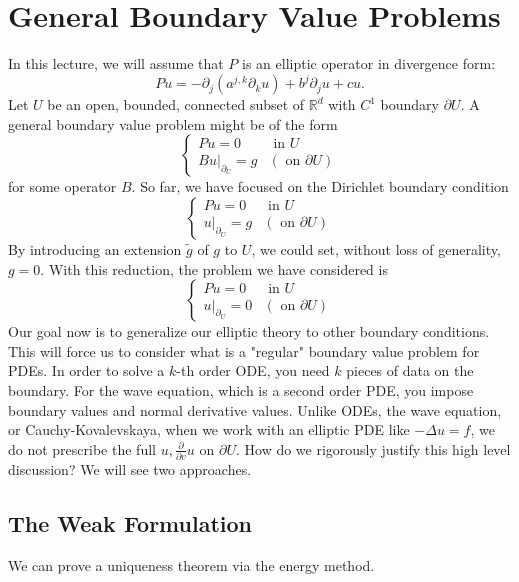 \newpage
\section{General Boundary Value Problems}

In this lecture, we will assume that $P$ is an elliptic operator in divergence form:
$$
P u=-\partial_{j}\left(a^{j, k} \partial_{k} u\right)+b^{j} \partial_{j} u+c u .
$$
Let $U$ be an open, bounded, connected subset of $\mathbb{R}^{d}$ with $C^{1}$ boundary $\partial U$. A general boundary value problem might be of the form
$$
\begin{cases}P u=0 & \text { in } U \\ \left.B u\right|_{\partial_{U}}=g & (\text { on } \partial U)\end{cases}
$$
for some operator $B$.
So far, we have focused on the Dirichlet boundary condition
$$
\begin{cases}P u=0 & \text { in } U \\ \left.u\right|_{\partial_{U}}=g & (\text { on } \partial U)\end{cases}
$$
By introducing an extension $\tilde{g}$ of $g$ to $U$, we could set, without loss of generality, $g=0$. With this reduction, the problem we have considered is
$$
\begin{cases}P u=0 & \text { in } U \\ \left.u\right|_{\partial_{U}}=0 & (\text { on } \partial U)\end{cases}
$$
Our goal now is to generalize our elliptic theory to other boundary conditions. This will force us to consider what is a "regular" boundary value problem for PDEs. In order to solve a $k$-th order ODE, you need $k$ pieces of data on the boundary. For the wave equation, which is a second order PDE, you impose boundary values and normal derivative values. Unlike ODEs, the wave equation, or Cauchy-Kovalevskaya, when we work with an elliptic PDE like $-\Delta u=f$, we do not prescribe the full $u, \frac{\partial}{\partial v} u$ on $\partial U$. How do we rigorously justify this high level discussion? We will see two approaches.

\subsection{The Weak Formulation}
We can prove a uniqueness theorem via the energy method. 

